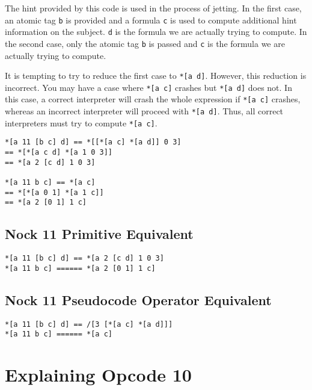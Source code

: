 \documentclass[twoside]{article}
\begin{document}
The hint provided by this code is used in the process of jetting. In the first case, an atomic tag \lstinline[style=inlinecode]{b} is provided and a formula \lstinline[style=inlinecode]{c} is used to compute additional hint information on the subject. \lstinline[style=inlinecode]{d} is the formula we are actually trying to compute. In the second case, only the atomic tag \lstinline[style=inlinecode]{b} is passed and \lstinline[style=inlinecode]{c} is the formula we are actually trying to compute.

It is tempting to try  to reduce the first case to \lstinline[style=inlinecode]{*[a d]}. However, this reduction is incorrect. You may have a case where \lstinline[style=inlinecode]{*[a c]} crashes but \lstinline[style=inlinecode]{*[a d]} does not. In this case, a correct interpreter will crash the whole expression if \lstinline[style=inlinecode]{*[a c]} crashes, whereas an incorrect interpreter will proceed with \lstinline[style=inlinecode]{*[a d]}. Thus, all correct interpreters must try
to compute \lstinline[style=inlinecode]{*[a c]}.

\begin{lstlisting}[style=listingblock]
*[a 11 [b c] d] == *[[*[a c] *[a d]] 0 3]
== *[*[a c d] *[a 1 0 3]]
== *[a 2 [c d] 1 0 3]

*[a 11 b c] == *[a c]
== *[*[a 0 1] *[a 1 c]]
== *[a 2 [0 1] 1 c]
\end{lstlisting}

\subsection*{Nock 11 Primitive Equivalent}

\begin{lstlisting}[style=listingcode]
*[a 11 [b c] d] == *[a 2 [c d] 1 0 3]
*[a 11 b c] ====== *[a 2 [0 1] 1 c]
\end{lstlisting}

\subsection*{Nock 11 Pseudocode Operator Equivalent}

\begin{lstlisting}[style=listingcode]
*[a 11 [b c] d] == /[3 [*[a c] *[a d]]]
*[a 11 b c] ====== *[a c]
\end{lstlisting}

\section{Explaining Opcode 10}
\end{document}
